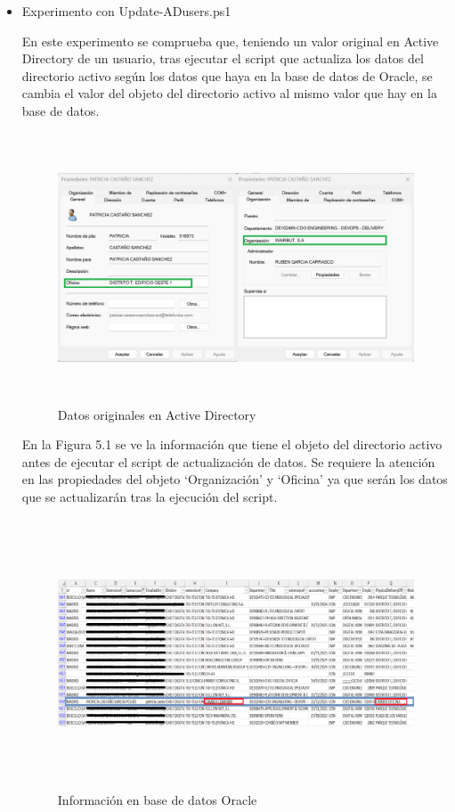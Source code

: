 \documentclass[a4paper, 12pt]{book}
\begin{document}
\begin{itemize}

\item Experimento con Update-ADusers.ps1

En este experimento se comprueba que, teniendo un valor original en Active Directory de un usuario, tras ejecutar el script que actualiza los datos del directorio activo según los datos que haya en la base de datos de Oracle, se cambia el valor del objeto del directorio activo al mismo valor que hay en la base de datos.

\begin{figure}[H]
	\centering
	\includegraphics[width=15cm, height=8cm, keepaspectratio]{img/image01.png}
	\caption{Datos originales en Active Directory}
	\label{fig:image01}
\end{figure}

En la Figura 5.1 se ve la información que tiene el objeto del directorio activo antes de ejecutar el script de actualización de datos. Se requiere la atención en las propiedades del objeto ‘Organización’ y ‘Oficina’ ya que serán los datos que se actualizarán tras la ejecución del script.

\begin{figure}[h]
	\centering
	\includegraphics[width=15cm, height=8cm, keepaspectratio]{img/image02.png}
	\caption{Información en base de datos Oracle}
	\label{fig:image02}
\end{figure}


\end{itemize}
\end{document}
